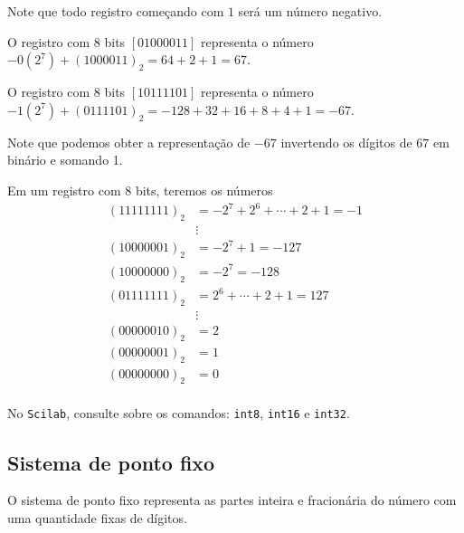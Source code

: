 \documentclass[main.tex]{subfiles}
\begin{document}
Note que todo registro começando com $1$ será um número negativo.

\begin{ex}
 O registro com $8$ bits $[01000011]$ representa o número
 $-0(2^7)+(1000011)_2=64+2+1=67$.

 O registro com $8$ bits $[10111101]$ representa o número
 $-1(2^7)+(0111101)_2=-128+ 32+16+8+4+1=-67$.

 Note que podemos obter a representação de $-67$ invertendo os dígitos de $67$ em binário e somando 1.
\end{ex}

\begin{ex}
Em um registro com $8$ bits, teremos os números
\begin{align*}
 (11111111)_2 &= -2^7+2^{6}+\cdots+2+1=-1\\
     &\vdots   \\
 (10000001)_2 &= -2^7+1 = -127 \\
 (10000000)_2 &= -2^7   = -128 \\
 (01111111)_2 &= 2^6+\cdots+2+1=127 \\
     &\vdots   \\
 (00000010)_2 &= 2 \\
 (00000001)_2 &= 1 \\
 (00000000)_2 &= 0 \\
\end{align*}
\end{ex}

\ifisscilab
\begin{obs}
  No \verb+Scilab+, consulte sobre os comandos: \verb'int8', \verb'int16' e \verb'int32'.
\end{obs}
\fi


\subsection{Sistema de ponto fixo}

O sistema de ponto fixo representa as partes inteira e fracionária do número com uma quantidade fixas de dígitos.
\end{document}
